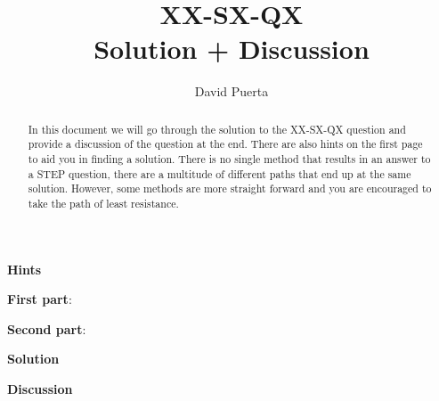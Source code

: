 \documentclass{article}
\title{XX-SX-QX \\ Solution + Discussion}
\author{David Puerta}
\date{}
\begin{document}
\maketitle

\begin{abstract}
    \noindent In this document we will go through the solution to the XX-SX-QX question and provide a discussion of the question at the end. There are also hints on the first page to aid you in finding a solution. There is no single method that results in an answer to a STEP question, there are a multitude of different paths that end up at the same solution. However, some methods are more straight forward and you are encouraged to take the path of least resistance.  
\end{abstract}

\vspace{1cm}

\begin{center}
    \textbf{Hints}
\end{center}

\textbf{First part}:

\vspace{1cm}

\textbf{Second part}: 



\newpage

\begin{center}
    \textbf{Solution}
\end{center}


\newpage

\begin{center}
    \textbf{Discussion}
\end{center}

\vspace{0.5cm}
\end{document}
